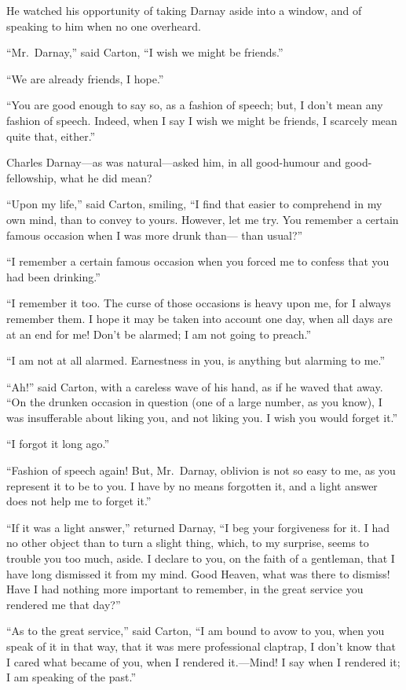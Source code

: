 He watched his opportunity of taking Darnay aside into a window, and
of speaking to him when no one overheard.

``Mr.\ Darnay,'' said Carton, ``I wish we might be friends.''

``We are already friends, I hope.''

``You are good enough to say so, as a fashion of speech; but, I don't
mean any fashion of speech.  Indeed, when I say I wish we might be friends,
I scarcely mean quite that, either.''

Charles Darnay---as was natural---asked him, in all good-humour and
good-fellowship, what he did mean?

``Upon my life,'' said Carton, smiling, ``I find that easier to comprehend
in my own mind, than to convey to yours.  However, let me try.  You
remember a certain famous occasion when I was more drunk than---%
than usual?''

``I remember a certain famous occasion when you forced me to confess
that you had been drinking.''

``I remember it too.  The curse of those occasions is heavy upon me,
for I always remember them.  I hope it may be taken into account one
day, when all days are at an end for me!  Don't be alarmed;
I am not going to preach.''

``I am not at all alarmed.  Earnestness in you, is anything but
alarming to me.''

``Ah!'' said Carton, with a careless wave of his hand, as if he waved
that away.  ``On the drunken occasion in question (one of a large number,
as you know), I was insufferable about liking you, and not liking you.
I wish you would forget it.''

``I forgot it long ago.''

``Fashion of speech again!  But, Mr.\ Darnay, oblivion is not so easy to
me, as you represent it to be to you.  I have by no means forgotten it,
and a light answer does not help me to forget it.''

``If it was a light answer,'' returned Darnay, ``I beg your forgiveness
for it. I had no other object than to turn a slight thing, which,
to my surprise, seems to trouble you too much, aside.  I declare to you,
on the faith of a gentleman, that I have long dismissed it from my mind.
Good Heaven, what was there to dismiss!  Have I had nothing more
important to remember, in the great service you rendered me that day?''

``As to the great service,'' said Carton, ``I am bound to avow to you,
when you speak of it in that way, that it was mere professional
claptrap, I don't know that I cared what became of you, when I
rendered  it.---Mind!  I say when I rendered it; I am speaking of the past.''


